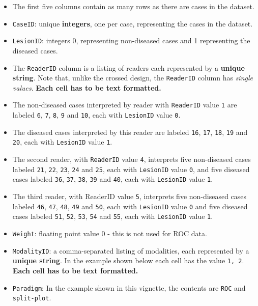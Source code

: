 \documentclass[]{book}
\providecommand{\tightlist}{%
  \setlength{\itemsep}{0pt}\setlength{\parskip}{0pt}}
\begin{document}
\begin{itemize}
\tightlist
\item
  The first five columns contain as many rows as there are cases in the dataset.
\item
  \texttt{CaseID}: unique \textbf{integers}, one per case, representing the cases in the dataset.
\item
  \texttt{LesionID}: integers 0, representing non-diseased cases and 1 representing the diseased cases.
\item
  The \texttt{ReaderID} column is a listing of readers each represented by a \textbf{unique string}. Note that, unlike the crossed design, the \texttt{ReaderID} column has \emph{single values}. \textbf{Each cell has to be text formatted.}
\item
  The non-diseased cases interpreted by reader with \texttt{ReaderID} value \texttt{1} are labeled \texttt{6}, \texttt{7}, \texttt{8}, \texttt{9} and \texttt{10}, each with \texttt{LesionID} value \texttt{0}.
\item
  The diseased cases interpreted by this reader are labeled \texttt{16}, \texttt{17}, \texttt{18}, \texttt{19} and \texttt{20}, each with \texttt{LesionID} value \texttt{1}.\\
\item
  The second reader, with \texttt{ReaderID} value \texttt{4}, interprets five non-diseased cases labeled \texttt{21}, \texttt{22}, \texttt{23}, \texttt{24} and \texttt{25}, each with \texttt{LesionID} value \texttt{0}, and five diseased cases labeled \texttt{36}, \texttt{37}, \texttt{38}, \texttt{39} and \texttt{40}, each with \texttt{LesionID} value \texttt{1}.\\
\item
  The third reader, with ReaderID value \texttt{5}, interprets five non-diseased cases labeled \texttt{46}, \texttt{47}, \texttt{48}, \texttt{49} and \texttt{50}, each with \texttt{LesionID} value \texttt{0} and five diseased cases labeled \texttt{51}, \texttt{52}, \texttt{53}, \texttt{54} and \texttt{55}, each with \texttt{LesionID} value \texttt{1}.\\
\item
  \texttt{Weight}: floating point value 0 - this is not used for ROC data.\\
\item
  \texttt{ModalityID}: a comma-separated listing of modalities, each represented by a \textbf{unique string}. In the example shown below each cell has the value \texttt{1,\ 2}. \textbf{Each cell has to be text formatted.}
\item
  \texttt{Paradigm}: In the example shown in this vignette, the contents are \texttt{ROC} and \texttt{split-plot}.
\end{itemize}
\end{document}
